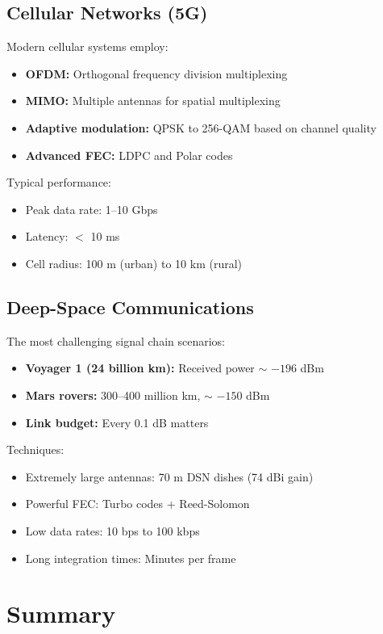\subsection{Cellular Networks (5G)}

Modern cellular systems employ:
\begin{itemize}
\item \textbf{OFDM:} Orthogonal frequency division multiplexing
\item \textbf{MIMO:} Multiple antennas for spatial multiplexing
\item \textbf{Adaptive modulation:} QPSK to 256-QAM based on channel quality
\item \textbf{Advanced FEC:} LDPC and Polar codes
\end{itemize}

Typical performance:
\begin{itemize}
\item Peak data rate: 1--10 Gbps
\item Latency: $<$ 10 ms
\item Cell radius: 100 m (urban) to 10 km (rural)
\end{itemize}

\subsection{Deep-Space Communications}

The most challenging signal chain scenarios:
\begin{itemize}
\item \textbf{Voyager 1 (24 billion km):} Received power $\sim$ $-196$ dBm
\item \textbf{Mars rovers:} 300--400 million km, $\sim$ $-150$ dBm
\item \textbf{Link budget:} Every 0.1 dB matters
\end{itemize}

Techniques:
\begin{itemize}
\item Extremely large antennas: 70 m DSN dishes (74 dBi gain)
\item Powerful FEC: Turbo codes + Reed-Solomon
\item Low data rates: 10 bps to 100 kbps
\item Long integration times: Minutes per frame
\end{itemize}

\section{Summary}

